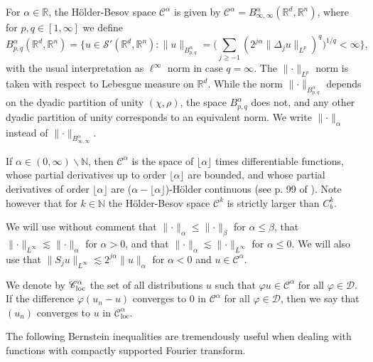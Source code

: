 \documentclass[a4paper,11pt]{article}
\newcommand{\cdummy}{\cdot}
\newcommand{\tmop}[1]{\ensuremath{\operatorname{#1}}}
\theoremstyle{remark}
\newcommand{\CC}{\ensuremath{\mathscr{C}}}
\newcommand{\CD}{\ensuremath{\mathscr{D}}}
\newcommand{\CS}{\ensuremath{\mathscr{S}}}
\begin{document}
For $\alpha \in \mathbb{R}$, the H{\"o}lder-Besov space $\CC^{\alpha}$ is given by $\CC^{\alpha} =B^{\alpha}_{\infty , \infty} (\mathbb{R}^{d},\mathbb{R}^{n} )$, where for $p,q \in [1, \infty ]$ we define
\[
   B^{\alpha}_{p,q} (\mathbb{R}^{d} ,\mathbb{R}^{n} ) = \bigg\{ u \in \CS'(\mathbb{R}^{d} ,\mathbb{R}^{n} ):\|u\|_{B^{\alpha}_{p,q}} = \bigg(\sum_{j \geqslant -1} (2^{j \alpha} \| \Delta_{j} u\|_{L^{p}} )^{q} \bigg)^{1/q} < \infty \bigg\},
\]
with the usual interpretation as $\ell^{\infty}$ norm in case $q= \infty$. The $\lVert \cdummy \rVert_{L^{p}}$ norm is taken with respect to Lebesgue measure on $\mathbb{R}^{d}$. While the norm $\lVert \cdummy \rVert_{B^{\alpha}_{p,q}}$ depends on the dyadic partition of unity $( \chi , \rho )$, the space $B^{\alpha}_{p,q}$ does not, and any other dyadic partition of unity corresponds to an equivalent norm. We write $\lVert \cdummy \rVert_{\alpha}$ instead of $\lVert \cdummy \rVert_{B^{\alpha}_{\infty , \infty}}$.

If $\alpha \in (0, \infty ) \backslash \mathbb{N}$, then $\CC^{\alpha}$ is the space of $\lfloor \alpha \rfloor$ times differentiable functions, whose partial derivatives up to order $\lfloor \alpha \rfloor$ are bounded, and whose partial derivatives of order $\lfloor \alpha \rfloor$ are ($\alpha - \lfloor \alpha \rfloor$)-H{\"o}lder continuous (see p. 99 of {\cite{Bahouri2011}}). Note however that for $k \in \mathbb{N}$ the H{\"o}lder-Besov space $\CC^{k}$ is strictly larger than $C^{k}_{b}$.

We will use without comment that $\lVert \cdummy \rVert_{\alpha} \leqslant \lVert \cdummy \rVert_{\beta}$ for $\alpha \leqslant \beta$, that $\lVert \cdummy \rVert_{L^{\infty}} \lesssim \lVert \cdummy \rVert_{\alpha}$ for $\alpha >0$, and that $\lVert \cdummy \rVert_{\alpha} \lesssim \lVert \cdummy \rVert_{L^{\infty}}$ for $\alpha \leqslant 0$. We will also use that $\|S_{j} u\|_{L^{\infty}} \lesssim 2^{j \alpha} \|u\|_{\alpha}$ for $\alpha <0$ and $u \in \CC^{\alpha}$.

We denote by $\CC^{\alpha}_{\text{\tmop{loc}}}$ the set of all distributions $u$ such that $\varphi u \in \CC^{\alpha}$ for all $\varphi \in \CD$. If the difference $\varphi(u_n - u)$ converges to $0$ in $\CC^\alpha$ for all $\varphi \in \CD$, then we say that $(u_n)$ converges to $u$ in $\CC^\alpha_{\tmop{loc}}$.

The following Bernstein inequalities are tremendously useful when dealing with functions with compactly supported Fourier transform.
\end{document}
